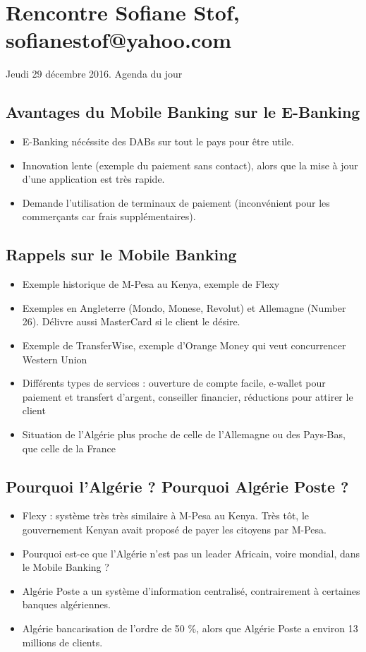 \documentclass{report}
\begin{document}
\section{Rencontre Sofiane Stof, sofianestof@yahoo.com}
Jeudi 29 décembre 2016. Agenda du jour
\subsection{Avantages du Mobile Banking sur le E-Banking}
\begin{itemize}
\item E-Banking nécéssite des DABs sur tout le pays pour être utile.
\item Innovation lente (exemple du paiement sans contact), alors que la mise à jour d'une application est très rapide.
\item Demande l'utilisation de terminaux de paiement (inconvénient pour les commerçants car frais supplémentaires).
\end{itemize}

\subsection{Rappels sur le Mobile Banking}
\begin{itemize}
\item Exemple historique de M-Pesa au Kenya, exemple de Flexy
\item Exemples en Angleterre (Mondo, Monese, Revolut) et Allemagne (Number 26). Délivre aussi MasterCard si le client le désire.
\item Exemple de TransferWise, exemple d'Orange Money qui veut concurrencer Western Union
\item Différents types de services : ouverture de compte facile, e-wallet pour paiement et transfert d'argent, conseiller financier, réductions pour attirer le client
\item Situation de l'Algérie plus proche de celle de l'Allemagne ou des Pays-Bas, que celle de la France
\end{itemize}

\subsection{Pourquoi l'Algérie ? Pourquoi Algérie Poste ?}
\begin{itemize}
\item Flexy : système très très similaire à M-Pesa au Kenya. Très tôt, le gouvernement Kenyan avait proposé de payer les citoyens par M-Pesa.
\item Pourquoi est-ce que l'Algérie n'est pas un leader Africain, voire mondial, dans le Mobile Banking ?
\item Algérie Poste a un système d'information centralisé, contrairement à certaines banques algériennes.
\item Algérie bancarisation de l'ordre de 50 \%, alors que Algérie Poste a environ 13 millions de clients.
\end{itemize}
\end{document}
